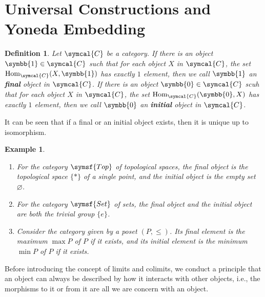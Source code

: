 \documentclass{article}
\theoremstyle{theorem}
\newtheorem{definition}{Definition}[section]
\newtheorem{example}{Example}[section]
\theoremstyle{remark}
\def\calC{{\symcal{C}}}
\DeclareMathOperator{\Hom}{Hom}
\begin{document}
\section{Universal Constructions and Yoneda Embedding}

\begin{definition}
    Let $\calC$ be a category. If there is an object $\symbb{1} \in \calC$ such that for each object $X$ in $\calC$, the set $\Hom_\calC(X, \symbb{1})$ has exactly $1$ element, then we call $\symbb{1}$ an \textbf{final} object in $\calC$. If there is an object $\symbb{0} \in \calC$ scuh that for each object $X$ in $\calC$, the set $\Hom_\calC(\symbb{0}, X)$ has exactly $1$ element, then we call $\symbb{0}$ an \textbf{initial} object in $\calC$.
\end{definition}

It can be seen that if a final or an initial object exists, then it is unique up to isomorphism. 

\begin{example}
    \begin{enumerate}
        \item For the category $\symsf{Top}$ of topological spaces, the final object is the topological space $\{\ast\}$ of a single point, and the initial object is the empty set $\varnothing$. 
        \item For the category $\symsf{Set}$ of sets, the final object and the initial object are both the trivial group $\{e\}$. 
        \item Consider the category given by a poset $(P, \leq)$. Its final element is the maximum $\max P$ of $P$ if it exists, and its initial element is the minimum $\min P$ of $P$ if it exists. 
    \end{enumerate}
\end{example}

Before introducing the concept of limits and colimits, we conduct a principle that an object can always be described by how it interacts with other objects, i.e., the morphisms to it or from it are all we are concern with an object. 
\end{document}
